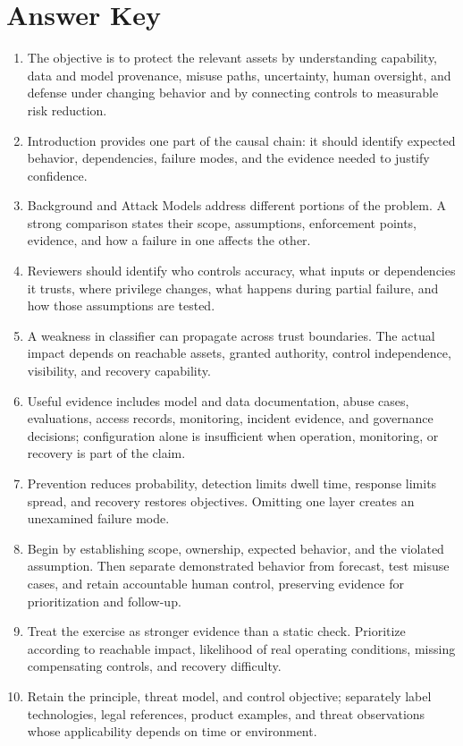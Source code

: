 \documentclass[11pt]{article}
\begin{document}
\section*{Answer Key}
\begin{enumerate}
\item The objective is to protect the relevant assets by understanding capability, data and model provenance, misuse paths, uncertainty, human oversight, and defense under changing behavior and by connecting controls to measurable risk reduction.
\item Introduction provides one part of the causal chain: it should identify expected behavior, dependencies, failure modes, and the evidence needed to justify confidence.
\item Background and Attack Models address different portions of the problem. A strong comparison states their scope, assumptions, enforcement points, evidence, and how a failure in one affects the other.
\item Reviewers should identify who controls accuracy, what inputs or dependencies it trusts, where privilege changes, what happens during partial failure, and how those assumptions are tested.
\item A weakness in classifier can propagate across trust boundaries. The actual impact depends on reachable assets, granted authority, control independence, visibility, and recovery capability.
\item Useful evidence includes model and data documentation, abuse cases, evaluations, access records, monitoring, incident evidence, and governance decisions; configuration alone is insufficient when operation, monitoring, or recovery is part of the claim.
\item Prevention reduces probability, detection limits dwell time, response limits spread, and recovery restores objectives. Omitting one layer creates an unexamined failure mode.
\item Begin by establishing scope, ownership, expected behavior, and the violated assumption. Then separate demonstrated behavior from forecast, test misuse cases, and retain accountable human control, preserving evidence for prioritization and follow-up.
\item Treat the exercise as stronger evidence than a static check. Prioritize according to reachable impact, likelihood of real operating conditions, missing compensating controls, and recovery difficulty.
\item Retain the principle, threat model, and control objective; separately label technologies, legal references, product examples, and threat observations whose applicability depends on time or environment.
\end{enumerate}
\end{document}
